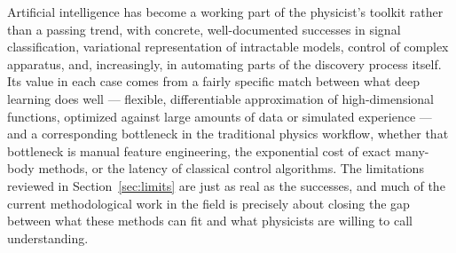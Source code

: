 \documentclass[11pt]{article}
\begin{document}
Artificial intelligence has become a working part of the physicist's toolkit rather than a passing trend, with concrete, well-documented successes in signal classification, variational representation of intractable models, control of complex apparatus, and, increasingly, in automating parts of the discovery process itself. Its value in each case comes from a fairly specific match between what deep learning does well --- flexible, differentiable approximation of high-dimensional functions, optimized against large amounts of data or simulated experience --- and a corresponding bottleneck in the traditional physics workflow, whether that bottleneck is manual feature engineering, the exponential cost of exact many-body methods, or the latency of classical control algorithms. The limitations reviewed in Section~\ref{sec:limits} are just as real as the successes, and much of the current methodological work in the field is precisely about closing the gap between what these methods can fit and what physicists are willing to call understanding.
\end{document}
